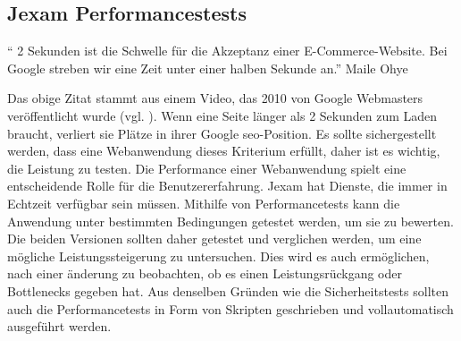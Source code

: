 \subsection{Jexam Performancestests}

\begin{center}
`` 2 Sekunden ist die Schwelle f\"ur die Akzeptanz einer E-Commerce-Website.
Bei Google streben wir eine Zeit unter einer halben Sekunde an.'' Maile Ohye
\end{center}
\>

Das obige Zitat stammt aus einem Video, das 2010 von Google Webmasters
ver\"offentlicht wurde (vgl. \cite{Ohye2010}). Wenn eine Seite l\"anger
als 2 Sekunden zum Laden braucht, verliert sie Pl\"atze in ihrer Google
\acs{seo}-Position. Es sollte sichergestellt werden, dass eine
Webanwendung dieses Kriterium erfüllt, daher ist es wichtig,
die Leistung zu testen. Die Performance einer Webanwendung spielt eine
entscheidende Rolle f\"ur die Benutzererfahrung. Jexam hat Dienste,
die immer in Echtzeit verf\"ugbar sein m\"ussen. Mithilfe von 
Performancetests kann die Anwendung unter bestimmten Bedingungen 
getestet werden, um sie zu bewerten. Die beiden Versionen sollten 
daher getestet und verglichen werden, um eine m\"ogliche Leistungssteigerung
zu untersuchen. Dies wird es auch erm\"oglichen, nach einer \"anderung 
zu beobachten, ob es einen Leistungsr\"uckgang oder Bottlenecks gegeben
hat.  Aus denselben Gr\"unden wie die Sicherheitstests sollten auch die 
Performancetests in Form von Skripten geschrieben und vollautomatisch
ausgef\"uhrt werden. 